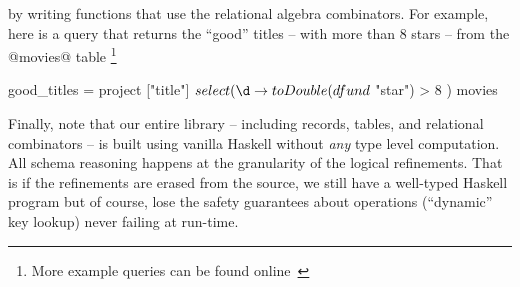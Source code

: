  by writing functions 
that use the relational algebra combinators. 
%
For example, here is a query that returns the 
``good'' titles -- with more than 8 stars -- 
from the @movies@ table
\footnote{More example queries can be found online~\cite{liquidhaskellgithub}}
%
\begin{code}
  good_titles = project ["title"] $ select (\d ->
                  toDouble (dfun d $ "star") > 8
                ) movies
\end{code}
%
%

Finally, note that our entire library -- including 
records, tables, and relational combinators -- is 
built using vanilla Haskell \ie without \emph{any} 
type level computation. 
%
All schema reasoning happens at the granularity of 
the logical refinements. That is if the refinements
are erased from the source, we still have a well-typed
Haskell program but of course, lose the safety 
guarantees about operations (\eg ``dynamic'' key lookup) 
never failing at run-time.


 

